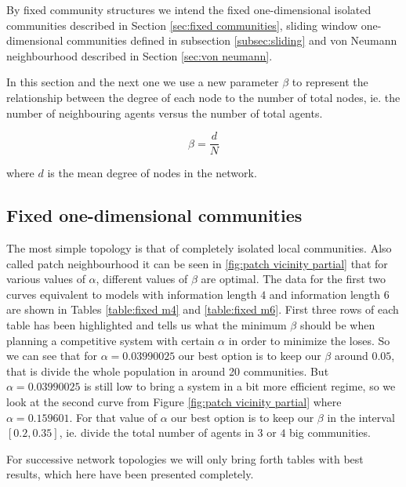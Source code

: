 By fixed community structures we intend the fixed one-dimensional isolated communities described in Section \ref{sec:fixed communities}, sliding window one-dimensional communities defined in subsection \ref{subsec:sliding} and von Neumann neighbourhood described in Section \ref{sec:von neumann}.

In this section and the next one we use a new parameter $\beta$ to represent the relationship between the degree of each node to the number of total nodes, ie. the number of neighbouring agents versus the number of total agents.

\begin{displaymath}
\beta = \frac{d}{N}
\end{displaymath}

where $d$ is the mean degree of nodes in the network.

\subsection{Fixed one-dimensional communities}

The most simple topology is that of completely isolated local communities.
Also called patch neighbourhood it can be seen in \ref{fig:patch vicinity partial} that for various values of $\alpha$, different values of $\beta$ are optimal.
The data for the first two curves equivalent to models with information length $4$ and information length $6$ are shown in Tables \ref{table:fixed m4} and \ref{table:fixed m6}.
First three rows of each table has been highlighted and tells us what the minimum $\beta$ should be when planning a competitive system with certain $\alpha$ in order to minimize the loses.
So we can see that for $\alpha=0.03990025$ our best option is to keep our $\beta$ around $0.05$, that is divide the whole population in around 20 communities.
But $\alpha=0.03990025$ is still low to bring a system in a bit more efficient regime, so we look at the second curve from Figure \ref{fig:patch vicinity partial} where $\alpha=0.159601$.
For that value of $\alpha$ our best option is to keep our $\beta$ in the interval $[0.2,0.35]$, ie. divide the total number of agents in $3$ or $4$ big communities.

For successive network topologies we will only bring forth tables with best results, which here have been presented completely.

